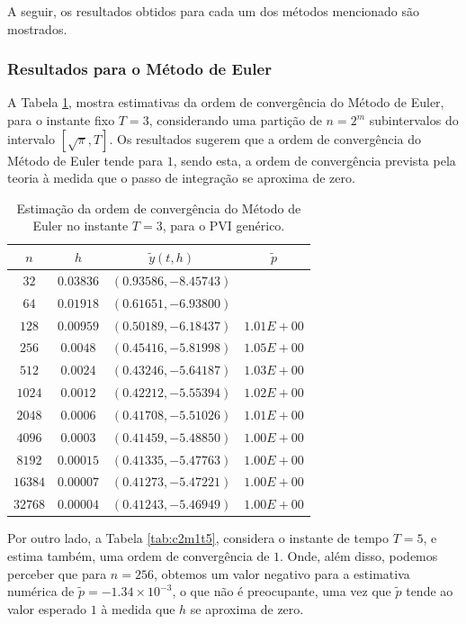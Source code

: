 \documentclass[twocolumn,amsmath,amssymb,floatfix]{revtex4}
\begin{document}
A seguir, os resultados obtidos para cada um dos métodos mencionado são mostrados.

\subsubsection{Resultados para o Método de Euler}
A Tabela \ref{tab:c2m1t3}, mostra estimativas da ordem de convergência do Método de Euler, para o instante fixo $T=3$, considerando uma partição de $n=2^m$ subintervalos do intervalo $[\sqrt{\pi}, T]$. Os resultados sugerem que a ordem de convergência do Método de Euler tende para $1$, sendo esta, a ordem de convergência prevista pela teoria à medida que o passo de integração se aproxima de zero.

\begin{table}[H]
 \centering
 \begin{tabular}{ c|c|c|c }
  \hline
  \hline
  $n$  & $h$  & $\tilde{y}(t,h)$ & $\tilde{p}$ \\
  \hline
  \hline
$32$&$0.03836$&	$ (0.93586, -8.45743)$ &	$ $ \\
\hline
$64$&$0.01918$&$ (0.61651,-6.93800)$&$ $\\
\hline
$128$&$0.00959	 $&$(   0.50189,   -6.18437)$&$	1.01E+00$\\
\hline
$256$&$0.0048	 $&$(   0.45416,   -5.81998)	$&$1.05E+00$\\
\hline
$512$&$0.0024	 $&$(   0.43246,   -5.64187)	$&$1.03E+00$\\
\hline
$1024$&$0.0012	 $&$(   0.42212,   -5.55394)	$&$1.02E+00$\\
\hline
$2048$&$0.0006	 $&$(   0.41708,   -5.51026)	$&$1.01E+00$\\
\hline
$4096$&$0.0003	 $&$(   0.41459,   -5.48850)	$&$1.00E+00$\\
\hline
$8192$&$0.00015	 $&$(   0.41335,   -5.47763)	$&$1.00E+00$\\
\hline
$16384$&$0.00007	 $&$(   0.41273,   -5.47221)	$&$1.00E+00$\\
\hline
$32768$&$0.00004	 $&$(   0.41243,   -5.46949)	$&$1.00E+00$\\
  \hline
  \hline
 \end{tabular}
   \caption{Estimação da ordem de convergência do Método de Euler no instante $T=3$, para o PVI genérico.} \label{tab:c2m1t3}
\end{table}

Por outro lado, a Tabela \ref{tab:c2m1t5}, considera o instante de tempo $T=5$, e estima também, uma ordem de convergência de $1$. Onde, além disso, podemos perceber que para $n=256$, obtemos um valor negativo para a estimativa numérica de $\tilde{p}=-1.34\times 10^{-3}$, o que não é preocupante, uma vez que $\tilde{p}$ tende ao valor esperado $1$ à medida que $h$ se aproxima de zero.
\end{document}

